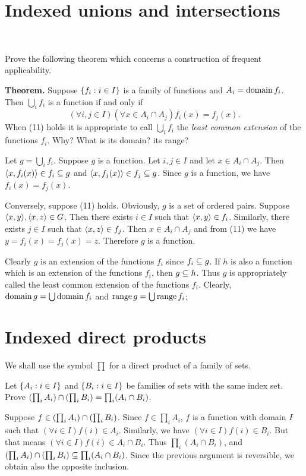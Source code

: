 \section{Indexed unions and intersections}\
\begin{exercise}
Prove the following theorem which concerns a construction of frequent applicability.

\textbf{Theorem.} Suppose $\left\{ f_i : i\in I \right\}$ is a family of functions and $A_i=\operatorname{domain} f_i$.
Then $\bigcup_i f_i$ is a function if and only if
\[(\forall i,j\in I)(\forall x\in A_i\cap A_j) f_i(x)=f_j(x).\tag{11} \]
When (11) holds it is appropriate to call $\bigcup_i f_i$ the
\textit{least common extension} of the functions $f_i$. Why? What is its domain? its range?
\end{exercise}

\begin{solution}
Let $g=\bigcup_i f_i$. Suppose $g$ is a function. Let $i,j\in I$ and let $x\in A_i\cap A_j$.
Then $\left\langle x, f_i(x)\right\rangle\in f_i\subseteq g$ and $\left\langle x, f_j(x)\right\rangle\in f_j\subseteq g$.
Since $g$ is a function, we have $f_i(x)=f_j(x)$.

Conversely, suppose (11) holds. Obviously, $g$ is a set of ordered pairs.
Suppose $\aprn{x,y},\aprn{x,z}\in G$.
Then there exists $i\in I$ such that $\left\langle x,y\right\rangle\in f_i$.
Similarly, there exists $j\in I$ such that $\left\langle x,z\right\rangle\in f_j$.
Then $x\in A_i\cap A_j$ and from (11) we have $y=f_i(x)=f_j(x)=z$.
Therefore $g$ is a function.

Clearly $g$ is an extension of the functions $f_i$ since $f_i\subseteq g$.
If $h$ is also a function which is an extension of the functions $f_i$, then $g\subseteq h$.
Thus $g$ is appropriately called
the least common extension of the functions $f_i$.
Clearly, $\operatorname{domain} g = \bigcup\operatorname{domain}{f_i}$ and $\operatorname{range} g = \bigcup \operatorname{range} f_i$;
\end{solution}

\section{Indexed direct products}
We shall use the symbol $\prod$ for a direct product of a family of sets.

\begin{exercise}
Let $\left\{ A_i : i\in I \right\}$ and $\left\{ B_i : i\in I \right\}$ be families of sets with the same index set.
Prove $\left(\prod_i A_i\right)\cap\left(\prod_i B_i\right) = \prod_i (A_i\cap B_i)$.
\end{exercise}

\begin{solution}
Suppose $f\in \left(\prod_i A_i\right)\cap\left(\prod_i B_i\right)$.
Since $f\in \prod_i A_i$, $f$ is a function with domain $I$ such that $(\forall i\in I)f(i)\in A_i$.
Similarly, we have $(\forall i\in I)f(i)\in B_i$.
But that means $(\forall i\in I)f(i)\in A_i\cap B_i$.
Thus $\prod_i (A_i\cap B_i)$, and $\left(\prod_i A_i\right)\cap\left(\prod_i B_i\right) \subseteq \prod_i (A_i\cap B_i)$.
Since the previous argument is reversible, we obtain also the opposite inclusion.
\end{solution}


